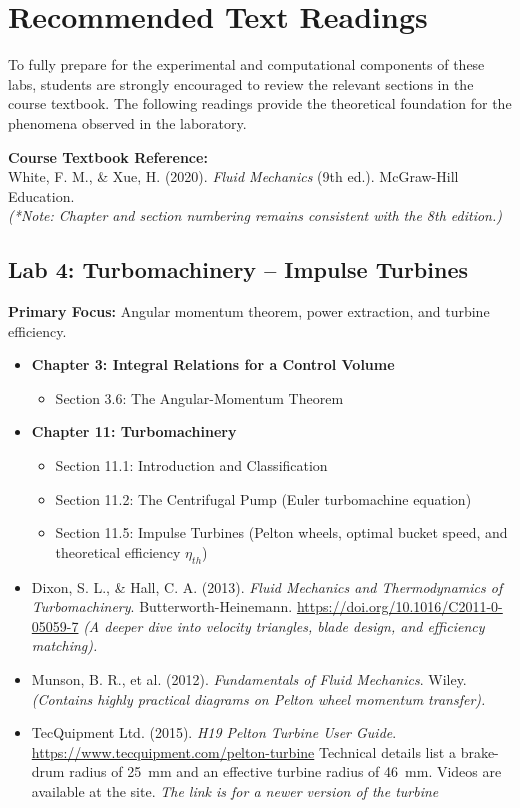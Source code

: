 \documentclass[12pt,letterpaper]{article}
\begin{document}
\section{Recommended Text Readings}

To fully prepare for the experimental and computational components of these labs, students are strongly encouraged to review the relevant sections in the course textbook. The following readings provide the theoretical foundation for the phenomena observed in the laboratory.

\vspace{0.3cm}
\noindent\textbf{Course Textbook Reference:} \\
White, F. M., \& Xue, H. (2020). \textit{Fluid Mechanics} (9th ed.). McGraw-Hill Education. \\
\textit{(*Note: Chapter and section numbering remains consistent with the 8th edition.)}
\vspace{0.3cm}



\subsection*{Lab 4: Turbomachinery -- Impulse Turbines}
\textbf{Primary Focus:} Angular momentum theorem, power extraction, and turbine efficiency.
\begin{itemize}
    \item \textbf{Chapter 3: Integral Relations for a Control Volume}
    \begin{itemize}
        \item Section 3.6: The Angular-Momentum Theorem
    \end{itemize}
    \item \textbf{Chapter 11: Turbomachinery}
    \begin{itemize}
        \item Section 11.1: Introduction and Classification
        \item Section 11.2: The Centrifugal Pump (Euler turbomachine equation)
        \item Section 11.5: Impulse Turbines (Pelton wheels, optimal bucket speed, and theoretical efficiency $\eta_{th}$)
    \end{itemize}
\end{itemize}
\begin{itemize}
        \item Dixon, S. L., \& Hall, C. A. (2013). \textit{Fluid Mechanics and Thermodynamics of Turbomachinery}. Butterworth-Heinemann. \url{https://doi.org/10.1016/C2011-0-05059-7}  \textit{(A deeper dive into velocity triangles, blade design, and efficiency matching).}
        \item Munson, B. R., et al. (2012). \textit{Fundamentals of Fluid Mechanics}. Wiley. \textit{(Contains highly practical diagrams on Pelton wheel momentum transfer).}
        \item TecQuipment Ltd. (2015). \textit{H19 Pelton Turbine User Guide}. \url{https://www.tecquipment.com/pelton-turbine} Technical details list a brake-drum radius of 25~mm and an effective turbine radius of 46~mm. Videos are available at the site. \textit{The link is for a newer version of the turbine}
    \end{itemize}
\end{document}
